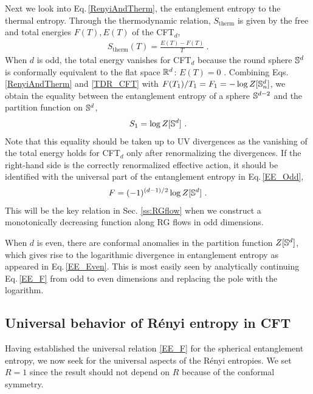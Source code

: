 Next we look into Eq.\,\eqref{RenyiAndTherm}, the entanglement entropy to the thermal entropy.
Through the thermodynamic relation, $S_\text{therm}$ is given by the free and total energies $F(T), E(T)$ of the CFT$_d$,
\begin{align}\label{TDR_CFT}
S_\text{therm}(T) = \frac{E(T) - F(T)}{T} \ .
\end{align}
When $d$ is odd, the total energy vanishes for CFT$_d$ because the round sphere $\mathbb{S}^d$ is conformally equivalent to the flat space $\mathbb{R}^d$: $E(T)=0$ \cite{Casini:2011kv,Klebanov:2011uf}.
Combining Eqs.\,\eqref{RenyiAndTherm} and \eqref{TDR_CFT} with $F(T_1)/T_1 = F_1 = -\log Z[\mathbb{S}^d_n]$, we obtain the equality between the entanglement entropy of a sphere $\mathbb{S}^{d-2}$ and the partition function on $\mathbb{S}^d$,
\begin{align}\label{EE_F}
S_1 = \log Z[\mathbb{S}^d] \ .
\end{align}
Note that this equality should be taken up to UV divergences as the vanishing of the total energy holds for CFT$_d$ only after renormalizing the divergences.
If the right-hand side is the correctly renormalized effective action, it should be identified with the universal part of the entanglement entropy in Eq.\,\eqref{EE_Odd}, 
\begin{align}
F = (-1)^{(d-1)/2}\log Z[\mathbb{S}^d] \ .
\end{align}
This will be the key relation in Sec. \ref{ss:RGflow} when we construct a monotonically decreasing function along RG flows in odd dimensions.

When $d$ is even, there are conformal anomalies in the partition function $Z[\mathbb{S}^d]$, which gives rise to the logarithmic divergence in entanglement entropy as appeared in Eq.\,\eqref{EE_Even}.
This is most easily seen by analytically continuing Eq.\,\eqref{EE_F} from odd to even dimensions and replacing the pole with the logarithm.


\subsection{Universal behavior of R{\' e}nyi entropy in CFT}
Having established the universal relation \eqref{EE_F} for the spherical entanglement entropy, we now seek for the universal aspects of the R{\'e}nyi entropies.
We set $R=1$ since the result should not depend on $R$ because of the conformal symmetry.

